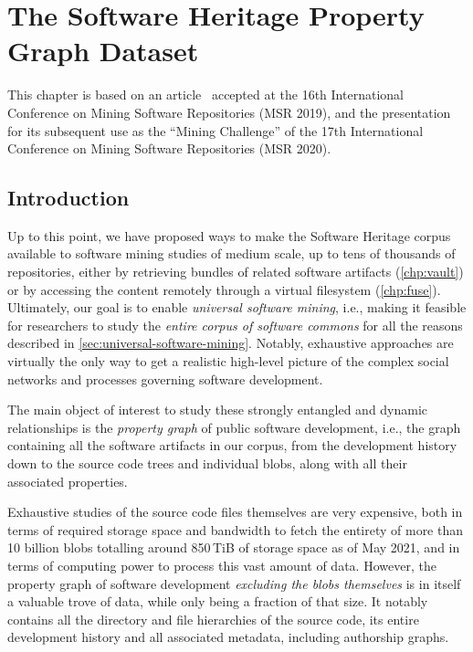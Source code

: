 \chapter{The Software Heritage Property Graph Dataset}%
\label{chp:graph-dataset}

This chapter is based on an article~\cite{swh-msr2019-dataset} accepted at the
16th International Conference on Mining Software Repositories (MSR 2019), and
the presentation~\cite{msr-2020-challenge} for its subsequent use as the
``Mining Challenge'' of the 17th International Conference on Mining Software
Repositories (MSR 2020).

\section{Introduction}

Up to this point, we have proposed ways to make the Software Heritage corpus
available to software mining studies of medium scale, up to tens of thousands
of repositories, either by retrieving bundles of related software artifacts
(\cref{chp:vault}) or by accessing the content remotely through a
virtual filesystem (\cref{chp:fuse}). Ultimately, our goal is to enable
\emph{universal software mining}, i.e., making it feasible for researchers to
study the \emph{entire corpus of software commons} for all the reasons
described in \cref{sec:universal-software-mining}. Notably, exhaustive
approaches are virtually the only way to get a realistic high-level picture of
the complex social networks and processes governing software development.

The main object of interest to study these strongly entangled and dynamic
relationships is the \emph{property graph} of public software development,
i.e., the graph containing all the software artifacts in our corpus, from the
development history down to the source code trees and individual blobs, along
with all their associated properties.

Exhaustive studies of the source code files themselves are very expensive, both
in terms of required storage space and bandwidth to fetch the entirety of more
than 10 billion blobs totalling around 850\,TiB of storage space as of May
2021, and in terms of computing power to process this vast amount of data.
However, the property graph of software development \emph{excluding the blobs
themselves} is in itself a valuable trove of data, while only being a fraction
of that size.  It notably contains all the directory and file hierarchies of
the source code, its entire development history and all associated metadata,
including authorship graphs.

